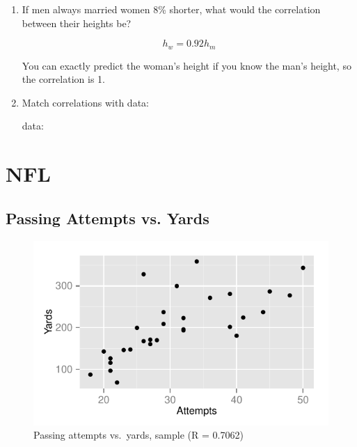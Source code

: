 \documentclass[landscape]{exam}
\begin{document}
\begin{enumerate}
\begin{solution}
      \end{solution}

    \item If men always married women 8\% shorter, what would the correlation
      between their heights be?
      \begin{solution}
        \[
          h_w = 0.92 h_m 
        \]

        You can exactly predict the woman's height if you know the man's
        height, so the correlation is 1.

      \end{solution}

    \item Match correlations with data:

      data:


  \end{enumerate}

  \section{NFL}

  \subsection{Passing Attempts vs. Yards}

  \begin{figure}[H]
    \centering
    \includegraphics{figures/nfl/attempts_vs_yards.pdf}
    \caption{Passing attempts vs.\ yards, sample (R = 0.7062)}
  \end{figure}
\end{document}
